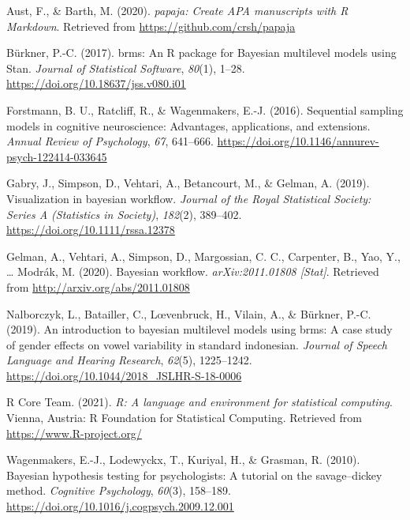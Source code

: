 \documentclass[
  11pt,
  english,
  ,doc,mask,floatsintext]{apa6}
\newlength{\cslhangindent}
\newlength{\cslentryspacingunit} %
\newenvironment{CSLReferences}[2] %
 {%
  \setlength{\parindent}{0pt}
  \ifodd #1
  \let\oldpar\par
  \def\par{\hangindent=\cslhangindent\oldpar}
  \fi
  \setlength{\parskip}{#2\cslentryspacingunit}
 }%
 {}
\begin{document}
\hypertarget{refs}{}
\begin{CSLReferences}{1}{0}
\leavevmode{}%
Aust, F., \& Barth, M. (2020). \emph{{papaja}: {Create} {APA} manuscripts with {R Markdown}}. Retrieved from \url{https://github.com/crsh/papaja}

\leavevmode{}%
Bürkner, P.-C. (2017). {brms}: An {R} package for {Bayesian} multilevel models using {Stan}. \emph{Journal of Statistical Software}, \emph{80}(1), 1--28. \url{https://doi.org/10.18637/jss.v080.i01}

\leavevmode{}%
Forstmann, B. U., Ratcliff, R., \& Wagenmakers, E.-J. (2016). Sequential sampling models in cognitive neuroscience: Advantages, applications, and extensions. \emph{Annual Review of Psychology}, \emph{67}, 641--666. \url{https://doi.org/10.1146/annurev-psych-122414-033645}

\leavevmode{}%
Gabry, J., Simpson, D., Vehtari, A., Betancourt, M., \& Gelman, A. (2019). Visualization in bayesian workﬂow. \emph{Journal of the Royal Statistical Society: Series A (Statistics in Society)}, \emph{182}(2), 389--402. \url{https://doi.org/10.1111/rssa.12378}

\leavevmode{}%
Gelman, A., Vehtari, A., Simpson, D., Margossian, C. C., Carpenter, B., Yao, Y., \ldots{} Modrák, M. (2020). Bayesian workflow. \emph{{arXiv}:2011.01808 {[}Stat{]}}. Retrieved from \url{http://arxiv.org/abs/2011.01808}

\leavevmode{}%
Nalborczyk, L., Batailler, C., Lœvenbruck, H., Vilain, A., \& Bürkner, P.-C. (2019). An introduction to bayesian multilevel models using brms: A case study of gender effects on vowel variability in standard indonesian. \emph{Journal of Speech Language and Hearing Research}, \emph{62}(5), 1225--1242. \url{https://doi.org/10.1044/2018_JSLHR-S-18-0006}

\leavevmode{}%
R Core Team. (2021). \emph{R: A language and environment for statistical computing}. Vienna, Austria: R Foundation for Statistical Computing. Retrieved from \url{https://www.R-project.org/}

\leavevmode{}%
Wagenmakers, E.-J., Lodewyckx, T., Kuriyal, H., \& Grasman, R. (2010). Bayesian hypothesis testing for psychologists: A tutorial on the savage--dickey method. \emph{Cognitive Psychology}, \emph{60}(3), 158--189. \url{https://doi.org/10.1016/j.cogpsych.2009.12.001}


\end{CSLReferences}
\end{document}
